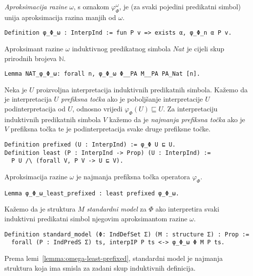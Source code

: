 \begin{definition}
  \textit{Aproksimacija razine} \(\omega\), s oznakom \(\varphi_{\Phi}^{\omega}\), je (za svaki pojedini predikatni simbol)
  unija aproksimacija razina manjih od \(\omega\).
\begin{verbatim}
Definition φ_Φ_ω : InterpInd := fun P v => exists α, φ_Φ_n α P v.
\end{verbatim}
\end{definition}

\begin{example}
  Aproksimant razine \(\omega\) induktivnog predikatnog simbola \(\mathit{Nat}\)
  je cijeli skup prirodnih brojeva \(\mathbb{N}\).
\begin{verbatim}
Lemma NAT_φ_Φ_ω: forall n, φ_Φ_ω Φ__PA M__PA PA_Nat [n].
\end{verbatim}
\end{example}

\begin{definition}
  Neka je \(U\) proizvoljna interpretacija induktivnih predikatnih simbola.
  Kažemo da je interpretacija \(U\) \textit{prefiksna točka} ako
  je poboljšanje interpretacije \(U\) podinterpretacija od \(U\),
  odnosno vrijedi \(\varphi_{\Phi}(U) \sqsubseteq U\).
  Za interpretaciju induktivnih predikatnih simbola \(V\) kažemo da je
  \textit{najmanja prefiksna točka} ako je \(V\) prefiksna točka 
  te je podinterpretacija svake druge prefiksne točke.
\begin{verbatim}
Definition prefixed (U : InterpInd) := φ_Φ U ⊑ U.
Definition least (P : InterpInd -> Prop) (U : InterpInd) :=
  P U /\ (forall V, P V -> U ⊑ V).
\end{verbatim}
\end{definition}

\begin{lemma}\label{lemma:omega-least-prefixed}
  Aproksimacija razine \(\omega\) je najmanja prefiksna točka operatora \(\varphi_{\Phi}\).
\begin{verbatim}
Lemma φ_Φ_ω_least_prefixed : least prefixed φ_Φ_ω.
\end{verbatim}
\end{lemma}

\begin{definition}
  Kažemo da je struktura \(M\) \textit{standardni model} za \(\Phi\) ako
  interpretira svaki induktivni predikatni simbol njegovim aproksimantom razine \(\omega\).
\begin{verbatim}
Definition standard_model (Φ: IndDefSet Σ) (M : structure Σ) : Prop :=
  forall (P : IndPredS Σ) ts, interpIP P ts <-> φ_Φ_ω Φ M P ts.
\end{verbatim}
\end{definition}
\noindent Prema lemi~\ref{lemma:omega-least-prefixed}, standardni model je
najmanja struktura koja ima smisla za zadani skup induktivnih definicija.

